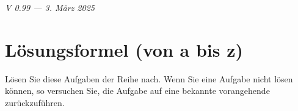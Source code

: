 %


\renewcommand{\bbwAufgabenBlockID}{GlQuad}

\ifisNURAUFGABEN
\newcommand{\LoesungsBlock}[1]{\TRAINER{#1%
\vspace{1mm}
\hrule}}%
\else
\newcommand{\LoesungsBlock}[1]{\noTRAINER{\TNTeop{}}\TRAINER{#1%
\vspace{1mm}
\hrule}}%
\fi

\renewcommand{\metaHeaderLine}{Arbeitsblatt Quadratische Gleichungen}
\renewcommand{\arbeitsblattTitel}{Quadratische Gleichungen: Aufgaben}

\newcommand{\TNTeopS}[1]{\TRAINER{#1}\noTRAINER{\TNTeop{}}}

\arbeitsblattHeader{}

\begin{center}\textit{\tiny{V 0.99 --- 3. März 2025}}\end{center}

\tableofcontents{}

\newpage

\section{Lösungsformel (von a bis z)}
Lösen Sie diese Aufgaben der Reihe nach. Wenn Sie eine Aufgabe nicht lösen können, so versuchen Sie, die Aufgabe auf eine bekannte vorangehende zurückzuführen.



